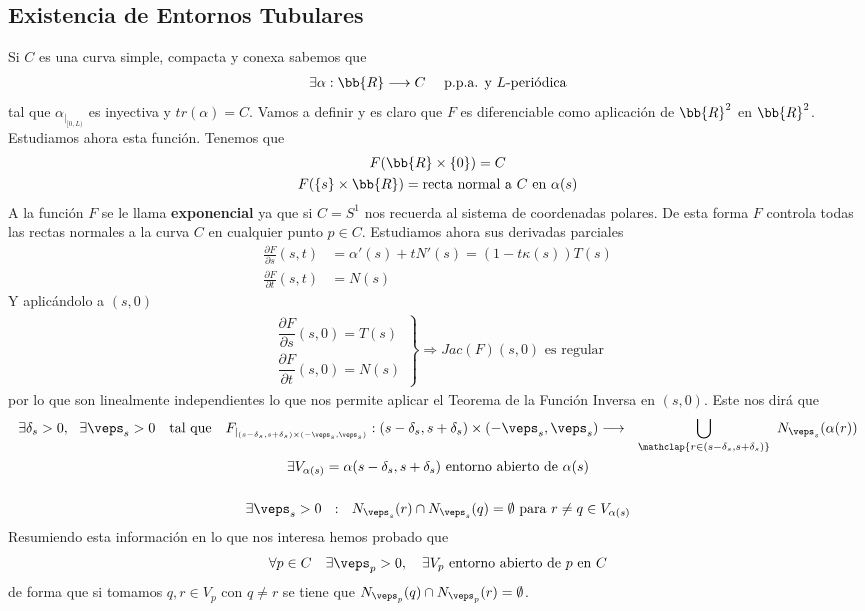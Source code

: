 \subsection{Existencia de Entornos Tubulares}
Si $C$ es una curva simple, compacta y conexa sabemos que 
\begin{gather*}
    \exists \alpha : \bb{R} \longrightarrow C \quad \text{ p.p.a. y $L$-periódica}
\end{gather*}
tal que $\alpha_{|_{[0,L)}}$ es inyectiva y $tr(\alpha)=C$. Vamos a definir 
y es claro que $F$ es diferenciable como aplicación de $\bb{R}^2$ en $\bb{R}^2$. Estudiamos ahora esta función.
Tenemos que 
\begin{gather*}
    F(\bb{R}\times \{0\}) = C\\
    F(\{s\} \times \bb{R}) = \text{recta normal a $C$ en $\alpha(s)$}
\end{gather*}
A la función $F$ se le llama \textbf{exponencial} ya que si $C=S^1$ nos recuerda al sistema de coordenadas polares. De esta forma $F$ controla todas las rectas normales a la curva $C$ en cualquier punto $p\in C$. Estudiamos ahora sus derivadas parciales
\begin{align*}
    \frac{\partial F}{\partial s}(s,t) &= \alpha'(s) + tN'(s) = (1-t\kappa(s)) T(s)\\[1.5em]
    \frac{\partial F}{\partial t}(s,t) &= N(s)
\end{align*}
Y aplicándolo a $(s,0)$
\begin{align*}
    \left.
        \begin{array}{c}
            \dfrac{\partial F}{\partial s}(s,0) = T(s)\\[1.5em]
            \dfrac{\partial F}{\partial t}(s,0) = N(s)
        \end{array}
    \right\} \Rightarrow Jac(F)(s,0) \text{ es regular}
\end{align*}
por lo que son linealmente independientes lo que nos permite aplicar el Teorema de la Función Inversa en $(s,0)$. Este nos dirá que 
\begin{gather*}
    \exists \delta_s >0 , \ \ \exists \veps_s > 0 \ \ \text{ tal que } \ \ F_{|_{(s-\delta_s, s+\delta_s) \times (-\veps_s, \veps_s)}} : (s-\delta_s, s+\delta_s) \times (-\veps_s, \veps_s) \longrightarrow \ \ \bigcup_{\mathclap{r\in(s-\delta_s, s+\delta_s)}}\ N_{\veps_s}(\alpha(r))\\
    \exists V_{\alpha(s)} = \alpha(s-\delta_s, s+\delta_s) \text{ entorno abierto de $\alpha(s)$} \\[1.5em]
    \exists \veps_s > 0 \ \ : \ \ N_{\veps_s}(r)\cap N_{\veps_s}(q) = \emptyset \text{ para } r\neq q \in V_{\alpha(s)}
\end{gather*}
Resumiendo esta información en lo que nos interesa hemos probado que 
\begin{gather*}
    \forall p \in C \quad \exists \veps_p > 0, \quad \exists V_p \text{ entorno abierto de $p$ en $C$}
\end{gather*}
de forma que si tomamos $q,r\in V_p$ con $q\neq r$ se tiene que $N_{\veps_p}(q)\cap N_{\veps_p}(r)=\emptyset$.\\

